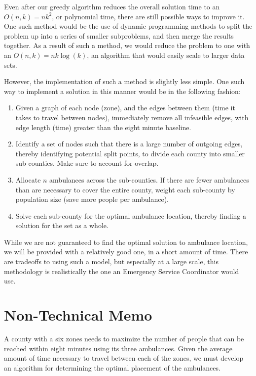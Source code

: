 \documentclass[notitlepage, 12pt]{article}
\begin{document}
Even after our greedy algorithm reduces the overall solution time to an $O(n, k) = nk^2$, or polynomial time, there
are still possible ways to improve it. One such method would be the use of dynamic programming methods to split the
problem up into a series of smaller subproblems, and then merge the results together. As a result of such a method,
we would reduce the problem to one with an $O(n, k) = nk\log(k)$, an algorithm that would easily scale to larger data sets.

However, the implementation of such a method is slightly less simple.
One such way to implement a solution in this manner would be in the following fashion:

\begin{enumerate}
\item Given a graph of each node (zone), and the edges between them (time it takes to travel between nodes),
    immediately remove all infeasible edges, with edge length (time) greater than the eight minute baseline.

\item Identify a set of nodes such that there is a large number of outgoing edges, thereby identifying potential
    split points, to divide each county into smaller sub-counties. Make sure to account for overlap.

\item Allocate $n$ ambulances across the sub-counties. If there are fewer ambulances than are necessary to cover
    the entire county, weight each sub-county by population size (save more people per ambulance).

\item Solve each sub-county for the optimal ambulance location, thereby finding a solution for the set as a whole.
\end{enumerate}

While we are not guaranteed to find the optimal solution to ambulance location, we will be provided with a relatively
good one, in a short amount of time. There are tradeoffs to using such a model, but especially at a large scale,
this methodology is realistically the one an Emergency Service Coordinator would use.

\newpage
\section{Non-Technical Memo}
A county with a six zones needs to maximize the number of people that can be reached within eight minutes using its three ambulances. Given the average amount of time necessary to travel  between each of the zones, we must develop an algorithm for determining the optimal placement of the ambulances.
	
\end{document}
